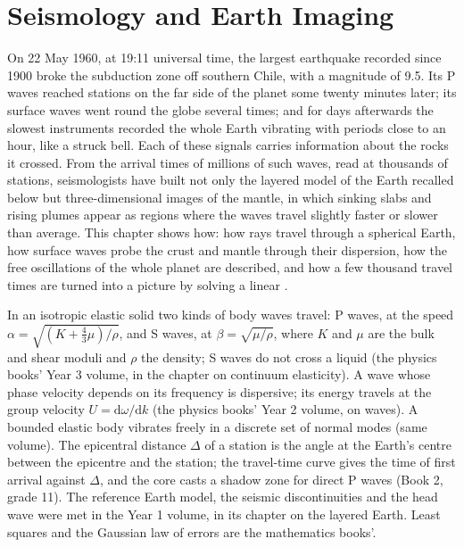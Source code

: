 \chapter{Seismology and Earth Imaging}\label{ch:b3:seismology-imaging}

On 22 May 1960, at 19:11 universal time, the largest earthquake recorded since
1900 broke the subduction zone off southern Chile, with a magnitude of 9.5.
Its P waves reached stations on the far side of the planet some twenty minutes
later; its surface waves went round the globe several times; and for days
afterwards the slowest instruments recorded the whole Earth vibrating with
periods close to an hour, like a struck bell. Each of these signals carries
information about the rocks it crossed. From the arrival times of millions of
such waves, read at thousands of stations, seismologists have built not only
the layered model of the Earth recalled below but three-dimensional images of
the mantle, in which sinking slabs and rising plumes appear as regions where
the waves travel slightly faster or slower than average. This chapter shows how:
how rays travel through a spherical Earth, how surface waves probe the crust
and mantle through their dispersion, how the free oscillations of the whole
planet are described, and how a few thousand travel times are turned into a
picture by solving a linear .

\begin{recall}
In an isotropic elastic solid two kinds of body waves travel: P waves, at the
speed $\alpha = \sqrt{(K + \tfrac43\mu)/\rho}$, and S waves, at
$\beta = \sqrt{\mu/\rho}$, where $K$ and $\mu$ are the bulk and shear moduli
and $\rho$ the density; S waves do not cross a liquid (the physics books' Year 3
volume, in the chapter on continuum elasticity). A wave whose phase velocity
depends on its frequency is dispersive; its energy travels at the group
velocity $U = \mathrm d\omega/\mathrm dk$ (the physics books' Year 2 volume, on
waves). A bounded elastic body vibrates freely in a discrete set of normal
modes (same volume). The epicentral distance $\Delta$ of a station is the angle
at the Earth's centre between the epicentre and the station; the travel-time
curve gives the time of first arrival against $\Delta$, and the core casts a
shadow zone for direct P waves (Book 2, grade 11). The reference Earth model,
the seismic discontinuities and the head wave were met in the Year 1 volume,
in its chapter on the layered Earth. Least squares and the Gaussian law of
errors are the mathematics books'.
\end{recall}

